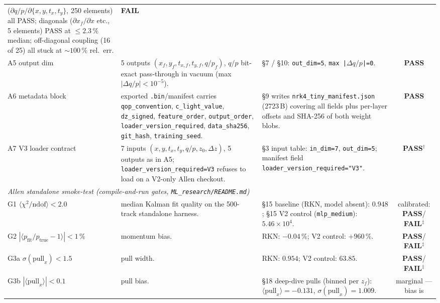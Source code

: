 \documentclass[11pt,a4paper]{article}
\newcommand{\dz}{\ensuremath{\Delta z}}
\newcommand{\qop}{\ensuremath{q/p}}
\newcommand{\PASS}{\textcolor{green!55!black}{\textbf{PASS}}}
\newcommand{\FAIL}{\textcolor{red!70!black}{\textbf{FAIL}}}
\begin{document}
\begin{longtable}{p{} p{} p{} c}
       (\(\partial \qop/\partial\{x,y,t_x,t_y\}\), 250 elements) all
       PASS; diagonals (\(\partial x_f/\partial x\) etc., 5 elements)
       PASS at \(\le 2.3\,\%\) median; off-diagonal coupling
       (16 of 25) all stuck at \(\sim 100\,\%\) rel.\ err. & \FAIL \\[3pt]
A5 output dim & 5 outputs \((x_f,y_f,t_{x,f},t_{y,f},\qop_f)\),
       \(\qop\) bit-exact pass-through in vacuum (max
       \(|\Delta\qop|<10^{-5}\)). & §7 / §10:
       \texttt{out\_dim=5}, \texttt{max\,|}\(\Delta\qop\)\texttt{|=0}. &
       \PASS \\[3pt]
A6 metadata block & exported \texttt{.bin}/manifest carries
       \texttt{qop\_convention}, \texttt{c\_light\_value},
       \texttt{dz\_signed}, \texttt{feature\_order},
       \texttt{output\_order}, \texttt{loader\_version\_required},
       \texttt{data\_sha256}, \texttt{git\_hash},
       \texttt{training\_seed}. & §9 writes
       \texttt{nrk4\_tiny\_manifest.json} (2723\,B) covering all
       fields plus per-layer offsets and SHA-256 of both weight
       blobs. & \PASS \\[3pt]
A7 V3 loader contract & 7 inputs
       \((x,y,t_x,t_y,\qop,z_0,\dz)\), 5 outputs as in A5;
       \texttt{loader\_version\_required=V3} refuses to load on a
       V2-only Allen checkout. & §3 input table:
       \texttt{in\_dim=7}, \texttt{out\_dim=5}; manifest field
       \texttt{loader\_version\_required="V3"}. & \PASS$^\dagger$ \\
\midrule
\multicolumn{4}{l}{\emph{Allen standalone smoke-test (compile-and-run gates,
                       \texttt{ML\_research/README.md})}}\\
G1 \(\langle\chi^2/\text{ndof}\rangle<2.0\) & median Kalman fit quality
       on the 500-track standalone harness. & §15 baseline (RKN, model
       absent): \(0.948\); §15 V2 control (\texttt{mlp\_medium}):
       \(5.46{\times}10^{4}\). & calibrated:
       \PASS / \FAIL$^{\ddagger}$ \\[3pt]
G2 \(|\langle p_\text{fit}/p_\text{true}-1\rangle|<1\,\%\) & momentum
       bias. & RKN: \(-0.04\,\%\); V2 control: \(+960\,\%\). &
       \PASS / \FAIL$^{\ddagger}$ \\[3pt]
G3a \(\sigma(\text{pull}_x)<1.5\) & pull width. &
       RKN: \(0.954\); V2 control: \(63.85\). &
       \PASS / \FAIL$^{\ddagger}$ \\[3pt]
G3b \(|\langle\text{pull}_x\rangle|<0.1\) & pull bias. &
       §18 deep-dive pulls (binned per \(z_f\)):
       \(\langle\text{pull}_x\rangle=-0.131\),
       \(\sigma(\text{pull}_x)=1.009\). & marginal --- bias is

\end{longtable}
\end{document}

